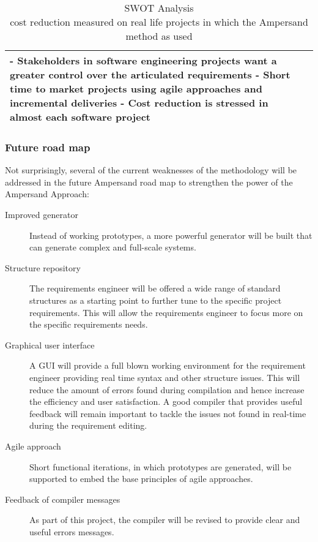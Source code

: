 \begin{table}[ht!]
\begin{tabular}{|p{8cm}||p{8cm}|}
- Stakeholders in software engineering projects want a greater control over the articulated requirements\newline
- Short time to market projects using agile approaches and incremental deliveries\newline
- Cost reduction is stressed in almost each software project \\\hline
\end{tabular}
\caption[SWOT Analysis]{SWOT Analysis\\\footnotesize * cost reduction measured on real life projects in which the Ampersand method as used }
\label{SWOT-Analysis}
\end{table}

\subsubsection{Future road map}

Not surprisingly, several of the current weaknesses of the methodology will be addressed in the future Ampersand road map to strengthen the power of the Ampersand Approach:
\begin{description}
	\item[Improved generator] Instead of working prototypes, a more powerful generator will be built that can generate complex and full-scale systems.
	\item[Structure repository] The requirements engineer will be offered a wide range of standard structures as a starting point to further tune to the specific project requirements.
	This will allow the requirements engineer to focus more on the specific requirements needs.
	\item[Graphical user interface] A GUI will provide a full blown working environment for the requirement engineer providing real time syntax and other structure issues. 
	This will reduce the amount of errors found during compilation and hence increase the efficiency and user satisfaction. 
	A good compiler that provides useful feedback will remain important to tackle the issues not found in real-time during the requirement editing.
	\item[Agile approach] Short functional iterations, in which prototypes are generated, will be supported to embed the base principles of agile approaches.
	\item[Feedback of compiler messages] As part of this project, the compiler will be revised to provide clear and useful errors messages.
\end{description}

